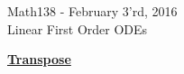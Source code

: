 \documentclass{letter}
\newcommand{\0}[1]{\begin{bmatrix}#1\end{bmatrix}}
\newcommand{\h}[1]{\underline{\textbf{#1}}}
\begin{document}
        \begin{center}
            \LARGE Math138 - February 3'rd, 2016\\
            \large Linear First Order ODEs
        \end{center}
        \vspace{0.25 in}
        
        \h{Transpose}
        
    
\end{document}
